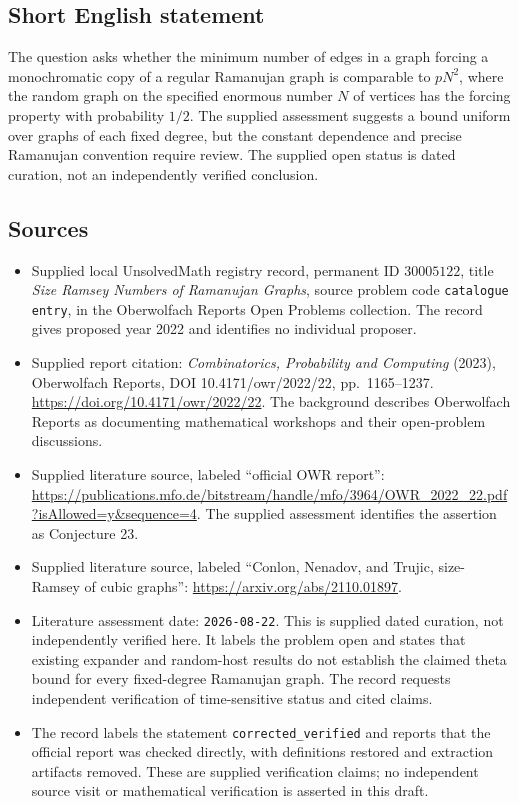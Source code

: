 \documentclass[11pt]{article}
\begin{document}
\subsection{Short English statement}
The question asks whether the minimum number of edges in a graph forcing a monochromatic copy of a regular Ramanujan graph is comparable to \(pN^2\), where the random graph on the specified enormous number \(N\) of vertices has the forcing property with probability \(1/2\). The supplied assessment suggests a bound uniform over graphs of each fixed degree, but the constant dependence and precise Ramanujan convention require review. The supplied open status is dated curation, not an independently verified conclusion.
\subsection{Sources}
\begin{itemize}
\item Supplied local UnsolvedMath registry record, permanent ID \(30005122\), title \emph{Size Ramsey Numbers of Ramanujan Graphs}, source problem code \texttt{catalogue entry}, in the Oberwolfach Reports Open Problems collection. The record gives proposed year 2022 and identifies no individual proposer.
\item Supplied report citation: \emph{Combinatorics, Probability and Computing} (2023), Oberwolfach Reports, DOI 10.4171/owr/2022/22, pp.\ 1165--1237. \url{https://doi.org/10.4171/owr/2022/22}. The background describes Oberwolfach Reports as documenting mathematical workshops and their open-problem discussions.
\item Supplied literature source, labeled ``official OWR report'': \url{https://publications.mfo.de/bitstream/handle/mfo/3964/OWR_2022_22.pdf?isAllowed=y&sequence=4}. The supplied assessment identifies the assertion as Conjecture 23.
\item Supplied literature source, labeled ``Conlon, Nenadov, and Trujic, size-Ramsey of cubic graphs'': \url{https://arxiv.org/abs/2110.01897}.
\item Literature assessment date: \texttt{2026-08-22}. This is supplied dated curation, not independently verified here. It labels the problem open and states that existing expander and random-host results do not establish the claimed theta bound for every fixed-degree Ramanujan graph. The record requests independent verification of time-sensitive status and cited claims.
\item The record labels the statement \texttt{corrected\_verified} and reports that the official report was checked directly, with definitions restored and extraction artifacts removed. These are supplied verification claims; no independent source visit or mathematical verification is asserted in this draft.
\end{itemize}
\end{document}
